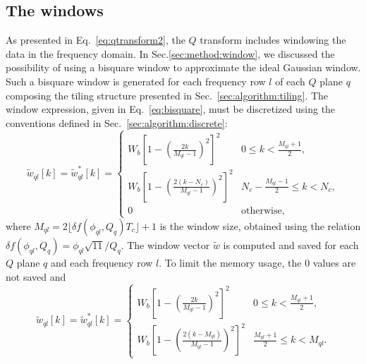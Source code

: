 \subsection{The windows} \label{sec:algorithm:window}
As presented in Eq.~\ref{eq:qtransform2}, the $Q$ transform includes windowing the data in the frequency domain. In Sec.\ref{sec:method:window}, we discussed the possibility of using a bisquare window to approximate the ideal Gaussian window. Such a bisquare window is generated for each frequency row $l$ of each $Q$ plane $q$ composing the tiling structure presented in Sec.~\ref{sec:algorithm:tiling}. The window expression, given in Eq.~\ref{eq:bisquare}, must be discretized using the conventions defined in Sec.~\ref{sec:algorithm:discrete}:
\begin{equation}
  \tilde{w}_{ql}[k] = \tilde{w}_{ql}^*[k] =
  \begin{cases}
    W_b \left[1 - \left(\frac{2k}{M_{ql}-1}\right)^2 \right]^2 & 0\le k < \frac{M_{ql}+1}{2}, \\
    W_b \left[1 - \left(\frac{2(k-N_c)}{M_{ql}-1}\right)^2 \right]^2 & N_c-\frac{M_{ql}-1}{2}\le k < N_c, \\
    0 & \textrm{otherwise},
  \end{cases}
  \label{eq:dbisquare1}
\end{equation}
where $M_{ql}=2\lfloor \delta f(\phi_{ql},Q_q) T_c \rfloor + 1$ is the window size, obtained using the relation $\delta f(\phi_{ql},Q_q) = \phi_{ql}\sqrt{11}/Q_q$. The window vector $\tilde{w}$ is computed and saved for each $Q$ plane $q$ and each frequency row $l$. To limit the memory usage, the 0 values are not saved and
\begin{equation}
  \tilde{w}_{ql}[k] = \tilde{w}_{ql}^*[k] =
  \begin{cases}
    W_b \left[1 - \left(\frac{2k}{M_{ql}-1}\right)^2 \right]^2 & 0\le k < \frac{M_{ql}+1}{2}, \\
    W_b \left[1 - \left(\frac{2(k-M_{ql})}{M_{ql}-1}\right)^2 \right]^2 & \frac{M_{ql}+1}{2}\le k < M_{ql}.
  \end{cases}
  \label{eq:dbisquare2}
\end{equation}


